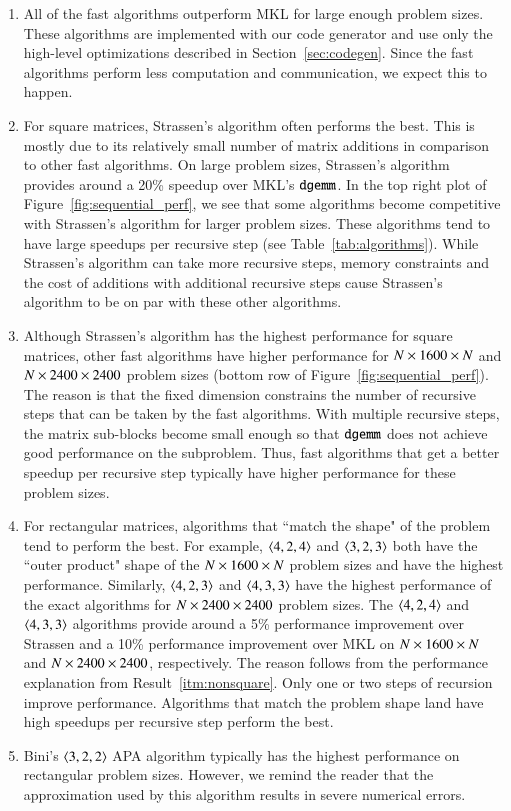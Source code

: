 \documentclass[preprint]{sigplanconf}
\begin{document}
\begin{enumerate}
\item
All of the fast algorithms outperform MKL for large enough problem sizes.
These algorithms are implemented with our code generator and use only the high-level optimizations described in Section~\ref{sec:codegen}.
Since the fast algorithms perform less computation and communication, we expect this to happen.

\item
For square matrices, Strassen's algorithm often performs the best.
This is mostly due to its relatively small number of matrix additions in comparison to other fast algorithms.
On large problem sizes, Strassen's algorithm provides around a 20\% speedup over MKL's $\texttt{dgemm}$.
In the top right plot of Figure~\ref{fig:sequential_perf}, we see that some algorithms become competitive with Strassen's algorithm for larger problem sizes.
These algorithms tend to have large speedups per recursive step (see Table~\ref{tab:algorithms}).
While Strassen's algorithm can take more recursive steps, memory constraints and the cost of additions with additional recursive steps cause Strassen's algorithm to be on par with these other algorithms.

\item\label{itm:nonsquare}
Although Strassen's algorithm has the highest performance for square matrices, other fast algorithms have higher performance for $N \times 1600 \times N$ and $N \times 2400 \times 2400$ problem sizes (bottom row of Figure~\ref{fig:sequential_perf}).
The reason is that the fixed dimension constrains the number of recursive steps that can be taken by the fast algorithms.
With multiple recursive steps, the matrix sub-blocks become small enough so that $\texttt{dgemm}$ does not achieve good performance on the subproblem.
Thus, fast algorithms that get a better speedup per recursive step typically have higher performance for these problem sizes.


\item
For rectangular matrices, algorithms that ``match the shape" of the problem tend to perform the best.
For example, $\left\langle4, 2, 4\right\rangle$ and $\left\langle3, 2, 3\right\rangle$ both have the ``outer product" shape of the $N \times 1600 \times N$ problem sizes and have the highest performance.
Similarly, $\left\langle4, 2, 3\right\rangle$ and $\left\langle4, 3, 3\right\rangle$ have the highest performance of the exact algorithms for $N \times 2400 \times 2400$ problem sizes.
The  $\left\langle4, 2, 4\right\rangle$ and $\left\langle4, 3, 3\right\rangle$ algorithms provide around a 5\% performance improvement over Strassen and a 10\% performance improvement over MKL on $N \times 1600 \times N$ and $N \times 2400 \times 2400$, respectively.
The reason follows from the performance explanation from Result~\ref{itm:nonsquare}.
Only one or two steps of recursion improve performance.
Algorithms that match the problem shape land have high speedups per recursive step perform the best.

\item
Bini's $\left\langle3, 2, 2\right\rangle$ APA algorithm typically has the highest performance on rectangular problem sizes.
However, we remind the reader that the approximation used by this algorithm results in severe numerical errors.

\end{enumerate}
\end{document}
